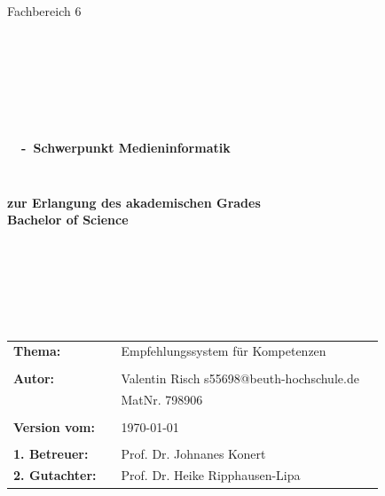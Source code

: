 \begin{center}
\Large{Fachbereich 6}
\end{center}
\begin{verbatim}




\end{verbatim}
\begin{center}
\doublespacing
\textbf{\LARGE{\titleDocument}}\\
\singlespacing
\begin{verbatim}

\end{verbatim}
\textbf{{~\subjectDocument~-~Schwerpunkt Medieninformatik}}
\end{center}
\begin{verbatim}

\end{verbatim}
\begin{center}

\end{center}
\begin{verbatim}

\end{verbatim}
\begin{center}
\textbf{zur Erlangung des akademischen Grades \\ Bachelor of Science}
\end{center}
\begin{verbatim}






\end{verbatim}
\begin{flushleft}
\begin{tabular}{llll}
\textbf{Thema:} & & Empfehlungssystem für Kompetenzen & \\
& & \\
\textbf{Autor:} & & Valentin Risch s55698@beuth-hochschule.de& \\
& & MatNr. 798906 & \\
& & \\
\textbf{Version vom:} & & \today &\\
& & \\
\textbf{1. Betreuer:} & & Prof. Dr. Johnanes Konert &\\
\textbf{2. Gutachter:} & & Prof. Dr. Heike Ripphausen-Lipa &\\
\end{tabular}
\end{flushleft}